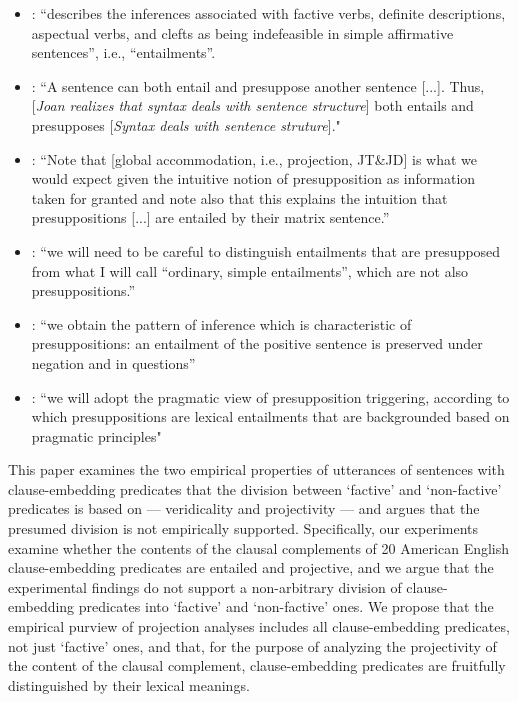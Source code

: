 \documentclass[11pt,fleqn]{article}
\newcommand{\6}{\mbox{$[\hspace*{-.6mm}[$}}
\newcommand{\9}{\mbox{$]\hspace*{-.6mm}]$}}
\begin{document}
\begin{itemize}[topsep=0pt,itemsep=-3pt,leftmargin=12pt]

\item \citealt[66f.]{beaver01}: \citet[119-123]{gazdar79a} ``describes the inferences associated with factive verbs, definite descriptions, aspectual verbs, and clefts as being indefeasible in simple affirmative sentences'', i.e., ``entailments''.

\item \citealt[355]{ccmg90}: ``A sentence can both entail and presuppose another sentence [...]. Thus, [{\em Joan realizes that syntax deals with sentence structure}] both entails and presupposes [{\em Syntax deals with sentence struture}]."

\item \citealt[345]{vds92}: ``Note that [global accommodation, i.e., projection, JT\&JD] is what we would expect given the intuitive notion of presupposition as information taken for granted and note also that this explains the intuition that presuppositions [...] are entailed by their matrix sentence.''

\item \citealt[3]{abbott06}: ``we will need to be careful to distinguish entailments that are presupposed from what I will call ``ordinary, simple entailments'', which are not also presuppositions.''

\item \citealt[139]{schlenker10}: ``we obtain the pattern of inference which is characteristic of presuppositions: an entailment of the positive sentence is preserved under negation and in questions''


\item \citealt[77]{anand-hacquard2014}: ``we will adopt the pragmatic view of presupposition triggering, according to which presuppositions are lexical entailments that are backgrounded based on pragmatic principles"

\end{itemize}

This paper examines the two empirical properties of utterances of sentences with clause-embedding predicates that the division between `factive' and `non-factive' predicates is based on --- veridicality and projectivity --- and argues that the presumed division is not empirically supported. Specifically, our experiments examine whether the contents of the clausal complements of 20 American English clause-embedding predicates are entailed and projective, and we argue that the experimental findings do not support a non-arbitrary division of clause-embedding predicates into `factive' and `non-factive' ones. We propose that the empirical purview of projection analyses includes all clause-embedding predicates, not just `factive' ones, and that, for the purpose of analyzing the projectivity of the content of the clausal complement, clause-embedding predicates are  fruitfully distinguished by their lexical meanings.
\end{document}
